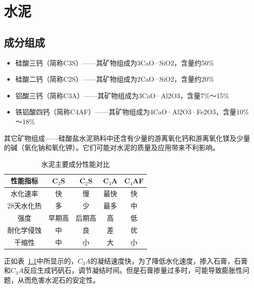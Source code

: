 \documentclass[12pt, a4paper, oneside, UTF8]{ctexbook}
\begin{document}

\else
\fi

\chapter{水泥}

\section{成分组成}

\begin{itemize}
	\item 硅酸三钙（简称C3S）——其矿物组成为3CaO·SiO2，含量约50\%
	\item 硅酸二钙（简称C2S）——其矿物组成为2CaO·SiO2，含量约20\%
	\item 铝酸三钙（简称C3A）——其矿物组成为3CaO·Al2O3，含量7\%～15\%
	\item 铁铝酸四钙（简称C4AF）——其矿物组成为4CaO·Al2O3·Fe2O3，含量10\%～18\%
\end{itemize}
其它矿物组成——硅酸盐水泥熟料中还含有少量的游离氧化钙和游离氧化镁及少量的碱（氧化钠和氧化钾）。它们可能对水泥的质量及应用带来不利影响。

\begin{table}[ht]
	\centering
	\begin{tabular}{|c|c|c|c|c|}
		\hline
		\textbf{性能指标} & \textbf{C$_3$S} & \textbf{C$_2$S} & \textbf{C$_3$A} & \textbf{C$_4$AF} \\ \hline
		水化速率          & 快              & 慢              & 最快            & 快              \\ \hline
		28天水化热        & 多              & 少              & 最多            & 中              \\ \hline
		强度              & 早期高          & 后期高          & 高              & 低              \\ \hline
		耐化学侵蚀        & 中              & 良              & 差              & 优              \\ \hline
		干缩性            & 中              & 小              & 大              & 小              \\ \hline
	\end{tabular}
	\caption{水泥主要成分性能对比}
	\label{cement-composition} %
\end{table}

正如表~\ref{cement-composition}中所显示的，\textbf{$C_3A$}的凝结速度快，为了降低水化速度，掺入石膏，石膏和\textbf{$C_3A$}反应生成钙矾石，调节凝结时间。但是石膏掺量过多时，可能导致膨胀性问题，从而危害水泥石的安定性。
\end{document}
